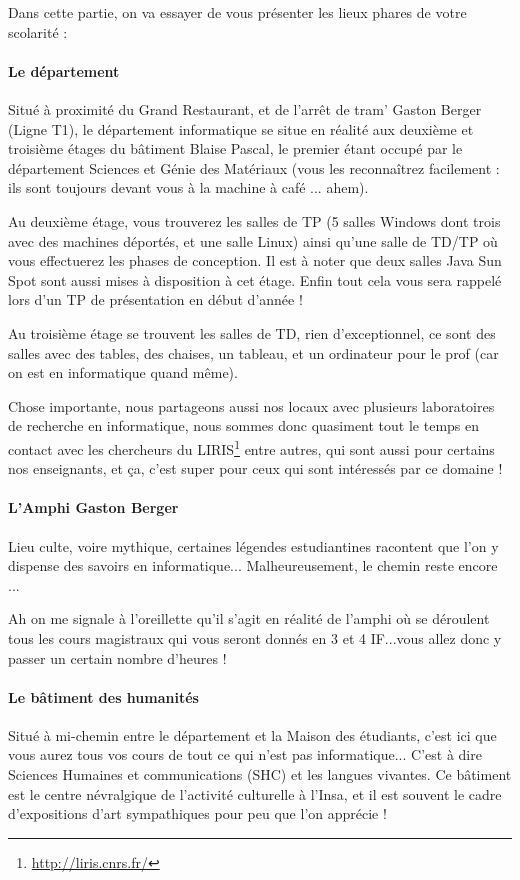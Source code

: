 Dans cette partie, on va essayer de vous présenter les lieux phares de votre scolarité : 

\paragraph{Le département}
Situé à proximité du Grand Restaurant, et de l'arrêt de tram' Gaston Berger
(Ligne T1), le département informatique se situe en réalité aux deuxième et
troisième étages du bâtiment Blaise Pascal, le premier étant occupé par le
département Sciences et Génie des Matériaux (vous les reconnaîtrez facilement :
ils sont toujours devant vous à la machine à café ... ahem).

Au deuxième étage, vous trouverez les salles de TP (5 salles Windows dont trois
avec des machines déportés, et une salle Linux) ainsi qu'une salle de
TD/TP où vous effectuerez les phases de conception. Il est à noter que deux
salles Java Sun Spot sont aussi mises à disposition à cet étage. Enfin tout
cela vous sera rappelé lors d'un TP de présentation en début d'année !

Au troisième étage se trouvent les salles de TD, rien d'exceptionnel, ce sont
des salles avec des tables, des chaises, un tableau, et un ordinateur pour le
prof (car on est en informatique quand même). 

Chose importante, nous partageons aussi nos locaux avec plusieurs laboratoires
de recherche en informatique, nous sommes donc quasiment tout le temps en
contact avec les chercheurs du LIRIS\footnote{\url{http://liris.cnrs.fr/}} entre autres, qui sont aussi pour certains
nos enseignants, et ça, c'est super pour ceux qui sont intéressés par ce domaine !

\paragraph{L'Amphi Gaston Berger}
Lieu culte, voire mythique, certaines légendes estudiantines racontent que l'on
y dispense des savoirs en informatique...  Malheureusement, le chemin reste
encore ... 

Ah on me signale à l'oreillette qu'il s'agit en réalité de l'amphi où se
déroulent tous les cours magistraux qui vous seront donnés en 3 et 4 IF...vous
allez donc y passer un certain nombre d'heures ! 

\paragraph{Le bâtiment des humanités}
Situé à mi-chemin entre le département et la Maison des étudiants, c'est ici
que vous aurez tous vos cours de tout ce qui n'est pas informatique... C'est à
dire Sciences Humaines et communications (SHC) et les langues vivantes. 
Ce bâtiment est le centre névralgique de l'activité culturelle à l'Insa, et il
est souvent le cadre d'expositions d'art sympathiques pour peu que l'on apprécie !

